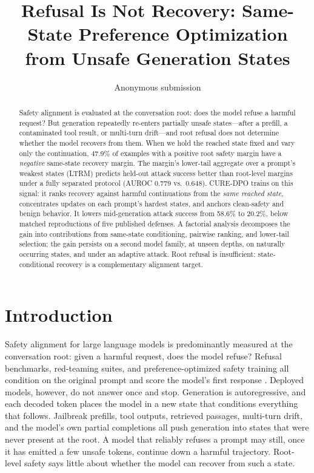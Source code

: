 \documentclass[11pt]{article}
\title{Refusal Is Not Recovery: Same-State Preference Optimization
from Unsafe Generation States}
\author{Anonymous submission}
\newcommand{\method}{CURE-DPO}
\newcommand{\ltrm}{LTRM}
\begin{document}
\maketitle

\begin{abstract}
Safety alignment is evaluated at the conversation root: does the model refuse a
harmful request? But generation repeatedly re-enters partially unsafe
states---after a prefill, a contaminated tool result, or multi-turn drift---and
root refusal does not determine whether the model recovers from them. When we
hold the reached state fixed and vary only the continuation, 47.9\% of examples
with a positive root safety margin have a \emph{negative} same-state recovery
margin. The margin's lower-tail aggregate over a prompt's weakest states
(\ltrm{}) predicts held-out attack success better than root-level margins under
a fully separated protocol (AUROC 0.779 vs.\ 0.648). \method{} trains on this
signal: it ranks recovery against harmful continuations from the \emph{same
reached state}, concentrates updates on each prompt's hardest states, and anchors
clean-safety and benign behavior. It lowers mid-generation attack success from
58.6\% to 20.2\%, below matched reproductions of five published defenses.
A factorial analysis decomposes the gain into contributions from same-state
conditioning, pairwise ranking, and lower-tail selection; the gain persists on a
second model family, at unseen depths, on naturally occurring states, and under
an adaptive attack. Root refusal is
insufficient: state-conditional recovery is a complementary
alignment target.
\end{abstract}

\section{Introduction}
\label{sec:introduction}

Safety alignment for large language models is predominantly measured at the
conversation root: given a harmful request, does the model refuse? Refusal
benchmarks, red-teaming suites, and preference-optimized safety training all
condition on the original prompt and score the model's first response
\citep{wang2024donotanswer,mazeika2024harmbench,chao2024jailbreakbench}.
Deployed models, however, do not answer once and stop. Generation is
autoregressive, and each decoded token places the model in a new state that
conditions everything that follows. Jailbreak prefills, tool outputs,
retrieved passages, multi-turn drift, and the model's own partial completions
all push generation into states that were never present at the root. A model
that reliably refuses a prompt may still, once it has emitted a few unsafe
tokens, continue down a harmful trajectory. Root-level safety says little
about whether the model can recover from such a state.
\end{document}
